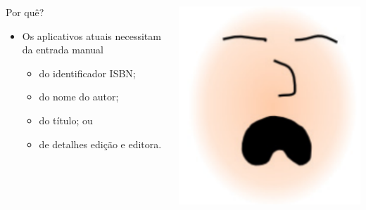\documentclass[14pt,beamer]{beamer}
\begin{document}
\begin{frame}
	\vspace{10px}
    \begin{columns}
        \begin{column}{.8\textwidth}
        \begin{block}{Por quê?}
            \begin{itemize}
                \item Os aplicativos atuais necessitam da entrada manual
                    \begin{itemize}
                    \item do identificador ISBN;
                    \item do nome do autor;
                    \item do título; ou 
                    \item de detalhes edição e editora.
                    \end{itemize}
            \end{itemize}
        \end{block}
        \end{column}
        \begin{column}{.2\textwidth}
            \includegraphics[scale=.3]{imagens/LixoSono}
        \end{column}
    \end{columns}
\end{frame}
\end{document}
